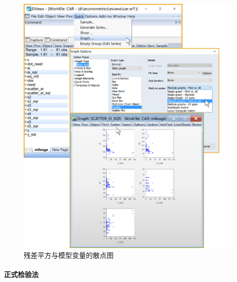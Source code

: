 \documentclass[12pt,(landscape,a4paper),(portrait,a4paper)]{article}
\let\oldparagraph\paragraph
\renewcommand{\paragraph}[1]{\oldparagraph{#1}\mbox{}}
\begin{document}
\begin{figure}

{\centering \includegraphics[width=28.06in]{picture/lab6-heteroskedasticity/3-scatter-ei-sqr} 

}

\caption{残差平方与模型变量的散点图}\label{fig:fig-scatter-ei-sqr}
\end{figure}

\paragraph{正式检验法}
\end{document}
